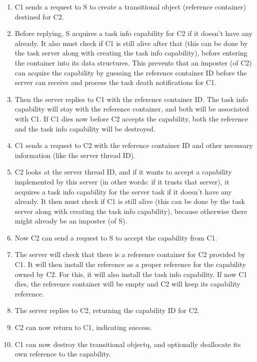 \documentclass[9pt,a4paper]{extarticle}
\begin{document}
\begin{enumerate}
\item C1 sends a request to S to create a transitional object
  (reference container) destined for C2.
\item Before replying, S acquires a task info capability for C2 if it
  doesn't have any already.  It also must check if C1 is still alive
  after that (this can be done by the task server along with creating
  the task info capability), before entering the container into its
  data structures.  This prevents that an imposter (of C2) can acquire
  the capability by guessing the reference container ID before the
  server can receive and process the task death notifications for C1.
\item Then the server replies to C1 with the reference container ID.
  The task info capability will stay with the reference container, and
  both will be associated with C1.  If C1 dies now before C2 accepts
  the capability, both the reference and the task info capability will
  be destroyed.
\item C1 sends a request to C2 with the reference container ID and
  other necessary information (like the server thread ID).
\item C2 looks at the server thread ID, and if it wants to accept a
  capability implemented by this server (in other words: if it trusts
  that server), it acquires a task info capability for the server task
  if it doesn't have any already.  It then must check if C1 is still
  alive (this can be done by the task server along with creating the
  task info capability), because otherwise there might already be an
  imposter (of S).
\item Now C2 can send a request to S to accept the capability from C1.
\item The server will check that there is a reference container for C2
  provided by C1.  It will then install the reference as a proper
  reference for the capability owned by C2.  For this, it will also
  install the task info capability.  If now C1 dies, the reference
  container will be empty and C2 will keep its capability reference.
\item The server replies to C2, returning the capability ID for C2.
\item C2 can now return to C1, indicating success.
\item C1 can now destroy the transitional objectq, and optionally
  deallocate its own reference to the capability.
\end{enumerate}
  
\end{document}
